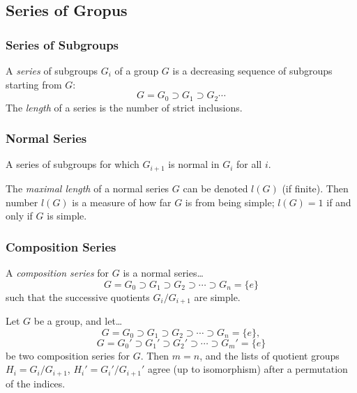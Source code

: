 \subsection{Series of Gropus}

\subsubsection{Series of Subgroups}\label{seriesofsubgroups}
A \emph{series} of subgroups $G_i$ of a group $G$ is a decreasing sequence of subgroups starting from $G$:
$$G = G_0 \supset G_1 \supset G_2 \cdots$$
The \emph{length} of a series is the number of strict inclusions.

\subsubsection{Normal Series}\label{normalseries}
A series of subgroups for which $G_{i+1}$ is normal in $G_i$ for all $i$.

\label{maximallengthofnormalseries}
The \emph{maximal length} of a normal series $G$ can be denoted $l(G)$ (if finite). Then number $l(G)$ is a measure of how far $G$ is from being simple; $l(G) = 1$ if and only if $G$ is simple.

\subsubsection{Composition Series}\label{compositionseries}
A \emph{composition series} for $G$ is a normal series\dots
$$G = G_0 \supset G_1 \supset G_2 \supset \cdots \supset G_n = \{ e \}$$
such that the successive quotients $G_i/G_{i+1}$ are simple.

\begin{theorem}
\label{jordanholder}
Let $G$ be a group, and let\dots
$$G = G_0 \supset G_1 \supset G_2 \supset \cdots \supset G_n = \{ e \},$$
$$G = G_0' \supset G_1' \supset G_2' \supset \cdots \supset G_m' = \{ e \}$$
be two composition series for $G$. Then $m = n$, and the lists of quotient groups $H_i = G_i/G_{i + 1}$, $H_i' = G_i'/G_{i+1}'$ agree (up to isomorphism) after a permutation of the indices.
\end{theorem}

